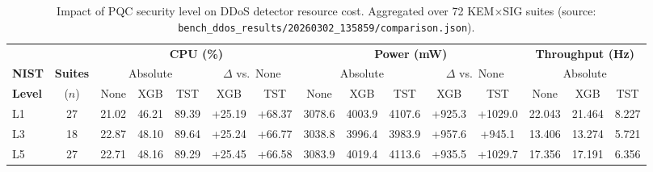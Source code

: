\begin{table}[!t]
\centering
\footnotesize
\setlength{\tabcolsep}{3.5pt}
\caption{Impact of PQC security level on DDoS detector resource cost.
Aggregated over 72 KEM$\times$SIG suites
(source: \texttt{bench\_ddos\_results/20260302\_135859/comparison.json}).}
\label{tab:pqc-impact-on-ddos}
\begin{tabular}{@{}l c ccc cc ccc cc ccc@{}}
\toprule
& & \multicolumn{5}{c}{\textbf{CPU (\%)}} & \multicolumn{5}{c}{\textbf{Power (mW)}} & \multicolumn{3}{c}{\textbf{Throughput (Hz)}} \\
\cmidrule(lr){3-7} \cmidrule(lr){8-12} \cmidrule(l){13-15}
\textbf{NIST} & \textbf{Suites} & \multicolumn{3}{c}{Absolute} & \multicolumn{2}{c}{$\Delta$ vs.\ None} & \multicolumn{3}{c}{Absolute} & \multicolumn{2}{c}{$\Delta$ vs.\ None} & \multicolumn{3}{c}{Absolute} \\
\cmidrule(lr){3-5} \cmidrule(lr){6-7} \cmidrule(lr){8-10} \cmidrule(lr){11-12} \cmidrule(l){13-15}
\textbf{Level} & ($n$) & None & XGB & TST & XGB & TST & None & XGB & TST & XGB & TST & None & XGB & TST \\
\midrule
L1 & 27 & 21.02 & 46.21 & 89.39 & +25.19 & +68.37 & 3078.6 & 4003.9 & 4107.6 & +925.3 & +1029.0 & 22.043 & 21.464 & 8.227 \\
L3 & 18 & 22.87 & 48.10 & 89.64 & +25.24 & +66.77 & 3038.8 & 3996.4 & 3983.9 & +957.6 & +945.1  & 13.406 & 13.274 & 5.721 \\
L5 & 27 & 22.71 & 48.16 & 89.29 & +25.45 & +66.58 & 3083.9 & 4019.4 & 4113.6 & +935.5 & +1029.7 & 17.356 & 17.191 & 6.356 \\
\bottomrule
\end{tabular}
\end{table}

